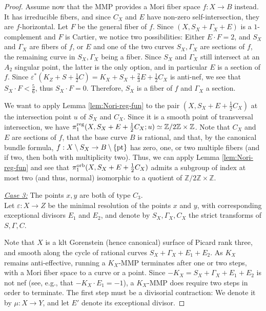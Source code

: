 \documentclass{amsart}
\theoremstyle{definition}
\theoremstyle{remark}
\numberwithin{equation}{section}
\begin{document}
\begin{proof}
Assume now that the MMP provides a Mori fiber space $f\colon X \rightarrow B$ instead. It has irreducible fibers, and since $C_X$ and $E$ have non-zero self-intersection, they are $f$-horizontal. Let $F$ be the general fiber of $f$.
Since $(X,S_X+\Gamma_X+E)$ is a $1$-complement and $F$ is Cartier, we notice two possibilities: Either $E\cdot F = 2$, and $S_X$ and $\Gamma_X$ are fibers of $f$, or $E$ and one of the two curves $S_X,\Gamma_X$ are sections of $f$, the remaining curve in $S_X,\Gamma_X$ being a fiber. Since $S_X$ and $\Gamma_X$ still intersect at an $A_2$ singular point, the latter is the only option, and in particular $E$ is a section of $f$. 
Since $\varepsilon^*(K_Z+S+\frac{1}{2}C) = K_X + S_X + \frac{2}{3} E + \frac{1}{2}C_X$
is anti-nef, we see that $S_X\cdot F<\frac{5}{6}$, thus $S_X\cdot F = 0$. Therefore, $S_X$ is a fiber of $f$ and $\Gamma_X$ a section. 

We want to apply Lemma \ref{lem:Nori-reg-fun} to the pair $(X,S_X+E+\frac{1}{2}C_X)$ at the intersection point $u$ of $S_X$ and $C_X$. Since it is a smooth point of transversal intersection, we have
$\pi_1^{\rm reg}(X,S_X+E+\frac{1}{2}C_X;u)\simeq\mathbb{Z}/2\mathbb{Z}\times\mathbb{Z}$. Note that $C_X$ and $E$ are sections of $f$, that the base curve $B$ is rational, and that, by the canonical bundle formula, $f: X\setminus S_X\to B\setminus\{\rm pt\}$ has zero, one, or two multiple fibers (and if two, then both with multiplicity two). Thus, we can apply Lemma \ref{lem:Nori-reg-fun} and see that $\pi_1^{\rm orb}(X,S_X+E+\frac{1}{2}C_X)$ admits a subgroup of index at most two (and thus, normal) isomorphic to a quotient of $\mathbb{Z}/2\mathbb{Z}\times\mathbb{Z}$.


\medskip 

\noindent\underline{\textit{Case 3:}} The points $x,y$ are both of type $C_3$.\\

Let $\varepsilon\colon X\rightarrow Z$ be the minimal resolution of the points $x$ and $y$, with corresponding exceptional divisors $E_1$ and $E_2$, and denote by $S_X,\Gamma_X,C_X$ the strict transforms of $S,\Gamma,C$. 

Note that $X$ is a klt Gorenstein (hence canonical) surface of Picard rank three, and smooth along the cycle of rational curves $S_X+\Gamma_X+E_1+E_2$.
As $K_X$ remains anti-effective, running a $K_X$-MMP terminates after one or two steps, with a Mori fiber space to a curve or a point. 
Since $-K_X = S_X+\Gamma_X+E_1+E_2$ is not nef (see, e.g., that $-K_X\cdot E_1 = -1$), a $K_X$-MMP does require two steps in order to terminate. The first step must be a divisorial contraction: We denote it by $\mu : X\to Y$, and let $E'$ denote its exceptional divisor.


\end{proof}
\end{document}
